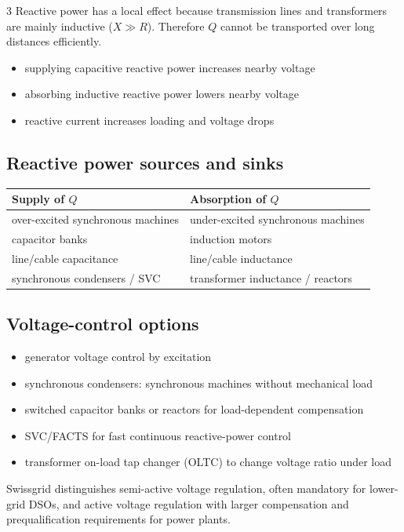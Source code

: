 \documentclass[9pt, landscape, a4paper]{article}
\begin{document}
\begin{multicols*}{3}
Reactive power has a local effect because transmission lines and transformers
are mainly inductive ($X\gg R$). Therefore $Q$ cannot be transported over long
distances efficiently.

\begin{itemize}
  \item supplying capacitive reactive power increases nearby voltage
  \item absorbing inductive reactive power lowers nearby voltage
  \item reactive current increases loading and voltage drops
\end{itemize}

\subsection{Reactive power sources and sinks}
\begin{tabularx}{\columnwidth}{@{}lX@{}}
  \toprule
  \textbf{Supply of $Q$} & \textbf{Absorption of $Q$}\\
  \midrule
  over-excited synchronous machines & under-excited synchronous machines\\
  capacitor banks & induction motors\\
  line/cable capacitance & line/cable inductance\\
  synchronous condensers / SVC & transformer inductance / reactors\\
  \bottomrule
\end{tabularx}

\subsection{Voltage-control options}
\begin{itemize}
  \item generator voltage control by excitation
  \item synchronous condensers: synchronous machines without mechanical load
  \item switched capacitor banks or reactors for load-dependent compensation
  \item SVC/FACTS for fast continuous reactive-power control
  \item transformer on-load tap changer (OLTC) to change voltage ratio under load
\end{itemize}
Swissgrid distinguishes semi-active voltage regulation, often mandatory for
lower-grid DSOs, and active voltage regulation with larger compensation and
prequalification requirements for power plants.


\end{multicols*}
\end{document}
